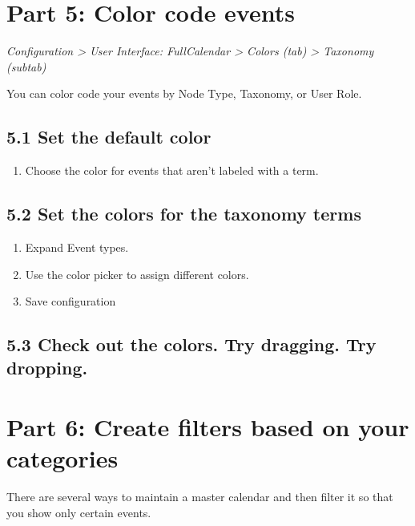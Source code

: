 \documentclass[letterpaper,10pt,english]{sphinxmanual}
\begin{document}
\chapter{Part 5: Color code events}
\label{event_calendar:part-5-color-code-events}
\emph{Configuration \textgreater{} User Interface: FullCalendar \textgreater{} Colors (tab) \textgreater{} Taxonomy (subtab)}

You can color code your events by Node Type, Taxonomy, or User Role.


\section{5.1 Set the default color}
\label{event_calendar:set-the-default-color}\begin{enumerate}
\item {} 
Choose the color for events that aren't labeled with a term.

\end{enumerate}


\section{5.2 Set the colors for the taxonomy terms}
\label{event_calendar:set-the-colors-for-the-taxonomy-terms}\begin{enumerate}
\item {} 
Expand Event types.

\item {} 
Use the color picker to assign different colors.

\item {} 
Save configuration

\end{enumerate}


\section{5.3 Check out the colors. Try dragging. Try dropping.}
\label{event_calendar:check-out-the-colors-try-dragging-try-dropping}

\chapter{Part 6: Create filters based on your categories}
\label{event_calendar:part-6-create-filters-based-on-your-categories}
There are several ways to maintain a master calendar and then filter it so that you show only certain events.
\end{document}
